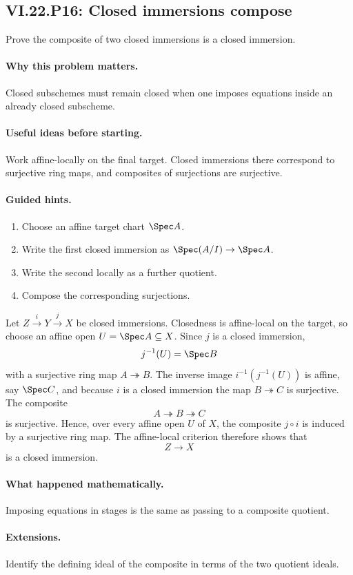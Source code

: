 \subsection*{VI.22.P16: Closed immersions compose}
\begin{problem}\label{prob:vi22-p16}
Prove the composite of two closed immersions is a closed immersion.
\end{problem}

\ifdefined\FullProblemDossiers
\paragraph{Why this problem matters.}
Closed subschemes must remain closed when one imposes equations inside an already closed subscheme.

\paragraph{Useful ideas before starting.}
Work affine-locally on the final target.  Closed immersions there correspond to surjective ring maps, and composites of surjections are surjective.

\paragraph{Guided hints.}
\begin{enumerate}
\item Choose an affine target chart $\Spec A$.
\item Write the first closed immersion as $\Spec(A/I)\to\Spec A$.
\item Write the second locally as a further quotient.
\item Compose the corresponding surjections.
\end{enumerate}

\begin{solution}
Let $Z\xrightarrow{i}Y\xrightarrow{j}X$ be closed immersions.  Closedness is
affine-local on the target, so choose an affine open $U=\Spec A\subseteq X$.  Since $j$ is a
closed immersion,
\[
 j^{-1}(U)=\Spec B
\]
with a surjective ring map $A\twoheadrightarrow B$.  The inverse image
$i^{-1}(j^{-1}(U))$ is affine, say $\Spec C$, and because $i$ is a closed immersion the map
$B\twoheadrightarrow C$ is surjective.  The composite
\[
 A\twoheadrightarrow B\twoheadrightarrow C
\]
is surjective.  Hence, over every affine open $U$ of $X$, the composite $j\circ i$ is induced
by a surjective ring map.  The affine-local criterion therefore shows that
\[
 Z\longrightarrow X
\]
is a closed immersion.
\end{solution}

\paragraph{What happened mathematically.}
Imposing equations in stages is the same as passing to a composite quotient.

\paragraph{Extensions.}
Identify the defining ideal of the composite in terms of the two quotient ideals.
\fi
